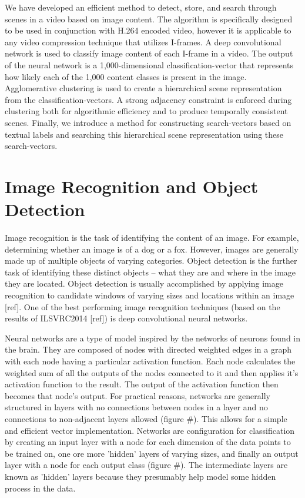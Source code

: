 \documentclass{article}
\begin{document}
We have developed an efficient method to detect, store, and search through scenes in a video based on image content.
The algorithm is specifically designed to be used in conjunction with H.264 encoded video, however it is applicable to any video compression technique that utilizes I-frames.
A deep convolutional network is used to classify image content of each I-frame in a video.
The output of the neural network is a 1,000-dimensional classification-vector that represents how likely each of the 1,000 content classes is present in the image.
Agglomerative clustering is used to create a hierarchical scene representation from the classification-vectors.
A strong adjacency constraint is enforced during clustering both for algorithmic efficiency and to produce temporally consistent scenes.
Finally, we introduce a method for constructing search-vectors based on textual labels and searching this hierarchical scene representation using these search-vectors.

\section{Image Recognition and Object Detection}

Image recognition is the task of identifying the content of an image.
For example, determining whether an image is of a dog or a fox.
However, images are generally made up of multiple objects of varying categories.
Object detection is the further task of identifying these distinct objects -- what they are and where in the image they are located.
Object detection is usually accomplished by applying image recognition to candidate windows of varying sizes and locations within an image [ref].
One of the best performing image recognition techniques (based on the results of ILSVRC2014 [ref]) is deep convolutional neural networks.

Neural networks are a type of model inspired by the networks of neurons found in the brain.
They are composed of nodes with directed weighted edges in a graph with each node having a particular activation function.
Each node calculates the weighted sum of all the outputs of the nodes connected to it and then applies it's activation function to the result.
The output of the activation function then becomes that node's output.
For practical reasons, networks are generally structured in layers with no connections between nodes in a layer and no connections to non-adjacent layers allowed (figure \#).
This allows for a simple and efficient vector implementation.
Networks are configuration for classification by creating an input layer with a node for each dimension of the data points to be trained on, one ore more 'hidden' layers of varying sizes, and finally an output layer with a node for each output class (figure \#).
The intermediate layers are known as 'hidden' layers because they presumably help model some hidden process in the data.
\end{document}

